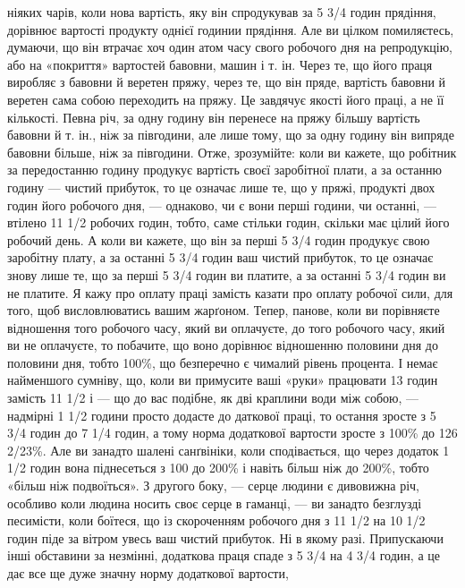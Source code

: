\parcont{}  %
ніяких чарів, коли нова вартість, яку він спродукував за 5 3/4 годин прядіння, дорівнює вартості
продукту однієї годинии прядіння. Але ви цілком помиляєтесь, думаючи, що він втрачає хоч один атом
часу свого робочого дня на репродукцію, або на «покриття» вартостей бавовни, машин і т. ін. Через
те, що його праця виробляє з бавовни й веретен пряжу, через те, що він пряде, вартість бавовни й
веретен сама собою переходить на пряжу.
Це завдячує якості його праці, а не її кількості. Певна річ, за одну годину він перенесе на пряжу
більшу вартість бавовни й т. ін., ніж за півгодини, але лише тому, що за одну годину він випряде
бавовни більше, ніж за півгодини. Отже, зрозумійте: коли ви кажете, що робітник за передостанню
годину продукує вартість своєї заробітної плати, а за останню годину — чистий прибуток, то це
означає лише те, що у пряжі, продукті двох годин його робочого дня, — однаково, чи є вони перші
години, чи останні, — втілено 11 1/2 робочих годин, тобто, саме стільки годин, скільки має цілий
його робочий день. А коли ви кажете, що він за перші 5 3/4 годин продукує свою заробітну плату, а за
останні 5 3/4 годин ваш чистий прибуток, то це означає знову лише те, що за перші 5 3/4 годин ви
платите, а за останні 5 3/4 годин
ви не платите. Я кажу про оплату праці замість казати про оплату робочої сили, для того, щоб
висловлюватись вашим жарґоном. Тепер, панове, коли ви порівняєте відношення того робочого
часу, який ви оплачуєте, до того робочого часу, який ви не оплачуєте, то побачите, що воно дорівнює
відношенню половини дня до половини дня, тобто 100\%, що безперечно є чималий рівень процента. І
немає найменшого сумніву, що, коли ви примусите ваші «руки» працювати 13 годин замість 11 1/2 і — що
до вас подібне, як дві краплини води між собою, — надмірні 1 1/2 години просто додасте до даткової
праці, то остання зросте з 5 3/4 годин до 7 1/4 годин, а тому норма додаткової вартости зросте з
100\% до 126 2/23\%. Але ви занадто шалені санґвініки, коли сподівається, що через додаток 1 1/2 годин
вона піднесеться з 100 до 200\% і навіть більш ніж до 200\%, тобто «більш ніж подвоїться». З другого
боку, — серце людини є дивовижна річ, особливо коли людина носить своє серце в гаманці, — ви занадто
безглузді песимісти, коли боїтеся, що із скороченням робочого
дня з 11 1/2 на 10 1/2 годин піде за вітром увесь ваш чистий прибуток. Ні в якому разі. Припускаючи
інші обставини за незмінні,
додаткова праця спаде з 5 3/4 на 4 3/4 годин, а це дає все ще дуже значну норму додаткової вартости,
